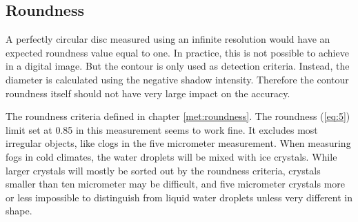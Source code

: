 \subsection{Roundness}

A perfectly circular disc measured using an infinite resolution would have an expected roundness value equal to one. In practice, this is not possible to achieve in a digital image. But the contour is only used as detection criteria. Instead, the diameter is calculated using the negative shadow intensity. Therefore the contour roundness itself should not have very large impact on the accuracy.

The roundness criteria defined in chapter \ref{met:roundness}. The roundness (\ref{eq:5}) limit set at 0.85 in this measurement seems to work fine. It excludes most irregular objects, like clogs in the five micrometer measurement. When measuring fogs in cold climates, the water droplets will be mixed with ice crystals. While larger crystals will mostly be sorted out by the roundness criteria, crystals smaller than ten micrometer may be difficult, and five micrometer crystals more or less impossible to distinguish from liquid water droplets unless very different in shape.

